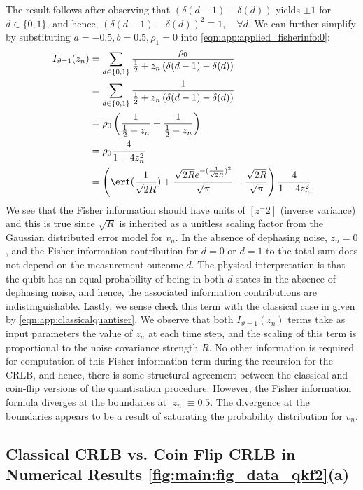 The result follows after observing that $\left( \delta(d-1) - \delta(d) \right)$ yields $\pm 1 $ for $d \in \{ 0,1 \}$, and hence, $\left( \delta(d-1) - \delta(d) \right)^2 \equiv 1, \quad \forall d$. We can further simplify by substituting $a=-0.5, b=0.5, \rho_1=0$ into \cref{eqn:app:applied_fisherinfo:0}:
\begin{align}
I_{\vartheta=1}(z_n) & = \sum_{d\in \{0, 1\}} \frac{\rho_0}{ \frac{1}{2} + z_n \left( \delta(d-1) - \delta(d) \right)}\\
& =  \sum_{d\in \{0, 1\}} \frac{1}{ \frac{1}{2} + z_n \left( \delta(d-1) - \delta(d) \right)} \\
& = \rho_0 \left( \frac{1}{ \frac{1}{2} + z_n} + \frac{1}{ \frac{1}{2} - z_n} \right) \\
& = \rho_0 \frac{4}{ 1 - 4z_n^2}  \\
& = \left( \erf(\frac{1}{\sqrt{2R}}) + \frac{\sqrt{2R} e^{-(\frac{1}{\sqrt{2R}})^2}}{\sqrt{\pi}}  - \frac{\sqrt{2R}}{\sqrt{\pi}} \right) \frac{4}{ 1 - 4z_n^2} \label{eqn:app:applied_fisherinfo:final}
\end{align}
We see that the Fisher information should have units of $[z^-2]$ (inverse variance) and this is true since $\sqrt{R}$ is inherited as a unitless scaling factor from the Gaussian distributed error model for $v_n$. In the absence of dephasing noise, $z_n=0$, and the Fisher information contribution for $d=0$ or $d=1$ to the total sum does not depend on the measurement outcome $d$. The physical interpretation is that the qubit has an equal probability of being in both $d$ states in the absence of dephasing noise, and hence, the associated information contributions are indistinguishable. Lastly, we sense check this term with the classical case in \cite{karlsson2005} given by \cref{eqn:app:classicalquantiser}. We observe that both $I_{\vartheta=1}(z_n)$ terms take as input parameters the value of $z_n$ at each time step, and the scaling of this term is proportional to the noise covariance strength $R$. No other information is required for computation of this Fisher information term during the recursion for the CRLB, and hence, there is some structural agreement between the classical and coin-flip versions of the quantisation procedure. However, the Fisher information formula diverges at the boundaries at $|z_n| \equiv 0.5$. The divergence at the boundaries appears to be a result of saturating the probability distribution for $v_n$. 

\subsection{Classical CRLB vs. Coin Flip CRLB in Numerical Results \cref{fig:main:fig_data_qkf2}(a)}

